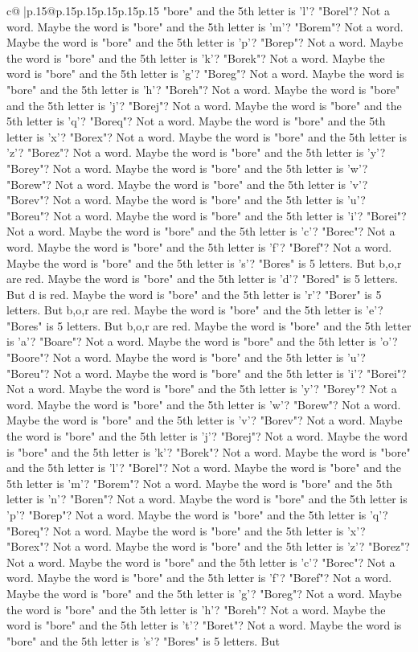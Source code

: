\documentclass{article}
\begin{document}
{\begin{supertabular}{c@{$\;$}|p{.15\linewidth}@{}p{.15\linewidth}p{.15\linewidth}p{.15\linewidth}p{.15\linewidth}p{.15\linewidth}}
{{{"bore" and the 5th letter is 'l'? "Borel"? Not a word. Maybe the word is "bore" and the 5th letter is 'm'? "Borem"? Not a word. Maybe the word is "bore" and the 5th letter is 'p'? "Borep"? Not a word. Maybe the word is "bore" and the 5th letter is 'k'? "Borek"? Not a word. Maybe the word is "bore" and the 5th letter is 'g'? "Boreg"? Not a word. Maybe the word is "bore" and the 5th letter is 'h'? "Boreh"? Not a word. Maybe the word is "bore" and the 5th letter is 'j'? "Borej"? Not a word. Maybe the word is "bore" and the 5th letter is 'q'? "Boreq"? Not a word. Maybe the word is "bore" and the 5th letter is 'x'? "Borex"? Not a word. Maybe the word is "bore" and the 5th letter is 'z'? "Borez"? Not a word. Maybe the word is "bore" and the 5th letter is 'y'? "Borey"? Not a word. Maybe the word is "bore" and the 5th letter is 'w'? "Borew"? Not a word. Maybe the word is "bore" and the 5th letter is 'v'? "Borev"? Not a word. Maybe the word is "bore" and the 5th letter is 'u'? "Boreu"? Not a word. Maybe the word is "bore" and the 5th letter is 'i'? "Borei"? Not a word. Maybe the word is "bore" and the 5th letter is 'c'? "Borec"? Not a word. Maybe the word is "bore" and the 5th letter is 'f'? "Boref"? Not a word. Maybe the word is "bore" and the 5th letter is 's'? "Bores" is 5 letters. But b,o,r are red. Maybe the word is "bore" and the 5th letter is 'd'? "Bored" is 5 letters. But d is red. Maybe the word is "bore" and the 5th letter is 'r'? "Borer" is 5 letters. But b,o,r are red. Maybe the word is "bore" and the 5th letter is 'e'? "Bores" is 5 letters. But b,o,r are red. Maybe the word is "bore" and the 5th letter is 'a'? "Boare"? Not a word. Maybe the word is "bore" and the 5th letter is 'o'? "Boore"? Not a word. Maybe the word is "bore" and the 5th letter is 'u'? "Boreu"? Not a word. Maybe the word is "bore" and the 5th letter is 'i'? "Borei"? Not a word. Maybe the word is "bore" and the 5th letter is 'y'? "Borey"? Not a word. Maybe the word is "bore" and the 5th letter is 'w'? "Borew"? Not a word. Maybe the word is "bore" and the 5th letter is 'v'? "Borev"? Not a word. Maybe the word is "bore" and the 5th letter is 'j'? "Borej"? Not a word. Maybe the word is "bore" and the 5th letter is 'k'? "Borek"? Not a word. Maybe the word is "bore" and the 5th letter is 'l'? "Borel"? Not a word. Maybe the word is "bore" and the 5th letter is 'm'? "Borem"? Not a word. Maybe the word is "bore" and the 5th letter is 'n'? "Boren"? Not a word. Maybe the word is "bore" and the 5th letter is 'p'? "Borep"? Not a word. Maybe the word is "bore" and the 5th letter is 'q'? "Boreq"? Not a word. Maybe the word is "bore" and the 5th letter is 'x'? "Borex"? Not a word. Maybe the word is "bore" and the 5th letter is 'z'? "Borez"? Not a word. Maybe the word is "bore" and the 5th letter is 'c'? "Borec"? Not a word. Maybe the word is "bore" and the 5th letter is 'f'? "Boref"? Not a word. Maybe the word is "bore" and the 5th letter is 'g'? "Boreg"? Not a word. Maybe the word is "bore" and the 5th letter is 'h'? "Boreh"? Not a word. Maybe the word is "bore" and the 5th letter is 't'? "Boret"? Not a word. Maybe the word is "bore" and the 5th letter is 's'? "Bores" is 5 letters. But }}}
\end{supertabular}}
\end{document}
